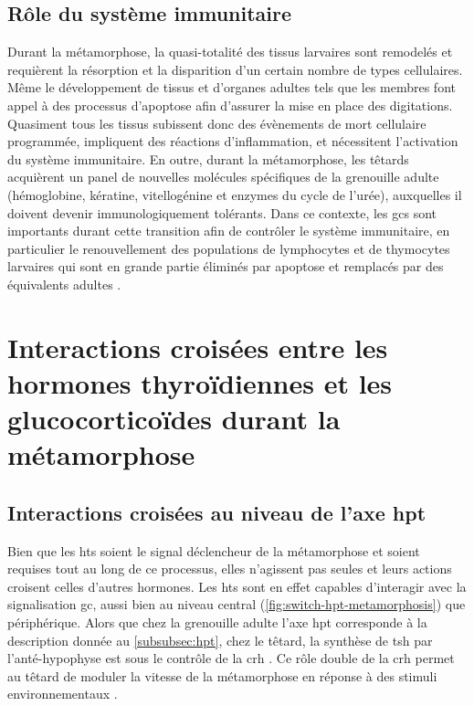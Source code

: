 \documentclass[../main.tex]{subfiles}
\begin{document}
	\subsection{Rôle du système immunitaire}
		Durant la métamorphose, la quasi-totalité des tissus larvaires sont remodelés et requièrent la résorption et la disparition d'un certain nombre de types cellulaires.
		Même le développement de tissus et d'organes adultes tels que les membres font appel à des processus d'apoptose afin d'assurer la mise en place des digitations.
		Quasiment tous les tissus subissent donc des évènements de mort cellulaire programmée, impliquent des réactions d'inflammation, et nécessitent l'activation du système immunitaire.
		En outre, durant la métamorphose, les têtards acquièrent un panel de nouvelles molécules spécifiques de la grenouille adulte (hémoglobine, kératine, vitellogénine et enzymes du cycle de l'urée), auxquelles il doivent devenir immunologiquement tolérants.
		Dans ce contexte, les \glspl{gc} sont importants durant cette transition afin de contrôler le système immunitaire, en particulier le renouvellement des populations de lymphocytes et de thymocytes larvaires qui sont en grande partie éliminés par apoptose et remplacés par des équivalents adultes \citep{Rollins-Smith1997,Schreiber2011}.




\section{Interactions croisées entre les hormones thyroïdiennes et les glucocorticoïdes durant la métamorphose}

	\subsection{Interactions croisées au niveau de l'axe \acrlong{hpt}}
		Bien que les \glspl{ht} soient le signal déclencheur de la métamorphose et soient requises tout au long de ce processus, elles n'agissent pas seules et leurs actions croisent celles d'autres hormones.
		Les \glspl{ht} sont en effet capables d'interagir avec la signalisation \gls{gc}, aussi bien au niveau central (\autoref{fig:switch-hpt-metamorphosis}) que périphérique.
		Alors que chez la grenouille adulte l'axe \gls{hpt} corresponde à la description donnée au \autoref{subsubsec:hpt}, chez le têtard, la synthèse de \gls{tsh} par l'anté-hypophyse est sous le contrôle de la \gls{crh} \citep{Denver1993}.
		Ce rôle double de la \gls{crh} permet au têtard de moduler la vitesse de la métamorphose en réponse à des stimuli environnementaux \citep{Denver1997a,Denver2009}.
\end{document}
